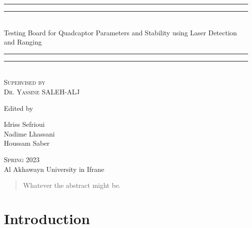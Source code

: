 \documentclass[12pt]{article}
\numberwithin{equation}{section}
\begin{document}
\begin{titlepage}


    \centering
    \vspace*{\baselineskip}
    \rule{\textwidth}{1.6pt}\vspace*{-\baselineskip}\vspace*{2pt}
    \rule{\textwidth}{0.4pt}\\[\baselineskip]
    {\LARGE Testing Board for Quadcaptor Parameters and Stability using Laser Detection and Ranging} 
    \rule{\textwidth}{0.4pt}\vspace*{-\baselineskip}\vspace{3.2pt}
    \rule{\textwidth}{1.6pt}\\[\baselineskip]
    \scshape
    Supervised by \\[\baselineskip] {\Large Dr. Yassine SALEH-ALJ}\par
    \vspace*{2\baselineskip}
    Edited by \\[\baselineskip]
    {\Large Idriss Sefrioui \\ Nadime Lhassani \\ Houssam Saber\par}
    \vfill
    {\scshape Spring 2023} \\
    {\large Al Akhawayn University in Ifrane}\par
  \end{titlepage}

\begin{abstract}
  Whatever the abstract might be.
\end{abstract}

\newpage

\tableofcontents
\newpage
\listoffigures
\newpage

\section{Introduction}
\end{document}
